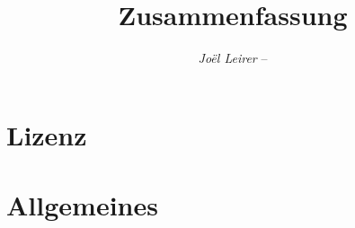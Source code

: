 \documentclass[margin=normal]{tex/hsrzf}
\author{\textsl{Joël Leirer} -- \texttt{\theauthoremail}}
\title{\texttt{\themodule} Zusammenfassung}
\date{\thesemester}
\begin{document}

\maketitle



\section*{Lizenz}
\doclicenseThis

\clearpage
\tableofcontents

\clearpage
\setcounter{page}{1}
\section{Allgemeines}
\end{document}
